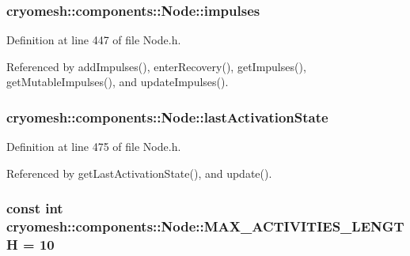 \hypertarget{classcryomesh_1_1components_1_1Node_a8e9ae8373052bb63f2f1e6e453a3c18d}{
\subsubsection[{impulses}]{ {\bf cryomesh\-::components\-::\-Node\-::impulses}}}\label{classcryomesh_1_1components_1_1Node_a8e9ae8373052bb63f2f1e6e453a3c18d}


\-Definition at line 447 of file \-Node.\-h.



\-Referenced by add\-Impulses(), enter\-Recovery(), get\-Impulses(), get\-Mutable\-Impulses(), and update\-Impulses().

\hypertarget{classcryomesh_1_1components_1_1Node_ab94a09be9e58cc248f9d62ed5c45c83d}{
\subsubsection[{last\-Activation\-State}]{ {\bf cryomesh\-::components\-::\-Node\-::last\-Activation\-State}}}\label{classcryomesh_1_1components_1_1Node_ab94a09be9e58cc248f9d62ed5c45c83d}


\-Definition at line 475 of file \-Node.\-h.



\-Referenced by get\-Last\-Activation\-State(), and update().

\hypertarget{classcryomesh_1_1components_1_1Node_ae5b4fa1289a3ab819710ff7a40a77282}{
\subsubsection[{\-M\-A\-X\-\_\-\-A\-C\-T\-I\-V\-I\-T\-I\-E\-S\-\_\-\-L\-E\-N\-G\-T\-H}]{\setlength{\rightskip}{0pt plus 5cm}const int {\bf cryomesh\-::components\-::\-Node\-::\-M\-A\-X\-\_\-\-A\-C\-T\-I\-V\-I\-T\-I\-E\-S\-\_\-\-L\-E\-N\-G\-T\-H} = 10}}\label{classcryomesh_1_1components_1_1Node_ae5b4fa1289a3ab819710ff7a40a77282}


